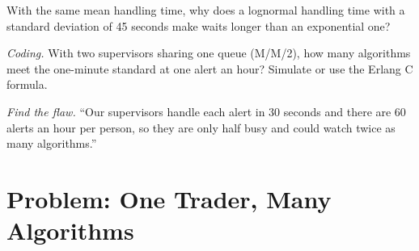 \begin{exercise}[$\star\star$]\label{exo:in:trader:6}
With the same mean handling time, why does a lognormal handling time with a standard deviation of 45 seconds make waits
longer than an exponential one?
\end{exercise}

\begin{exercise}[$\star\star\star$]\label{exo:in:trader:7}
\emph{Coding.} With two supervisors sharing one queue (M/M/2), how many algorithms meet the one-minute standard at one
alert an hour? Simulate or use the Erlang C formula.
\end{exercise}

\begin{exercise}[$\star\star\star$]\label{exo:in:trader:8}
\emph{Find the flaw.} ``Our supervisors handle each alert in 30 seconds and there are 60 alerts an hour per person, so they
are only half busy and could watch twice as many algorithms.''
\end{exercise}

\section{Problem: One Trader, Many Algorithms}

